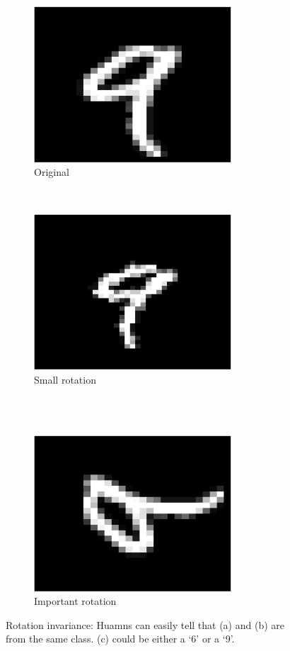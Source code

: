 \documentclass[a4paper,11pt]{report}
\begin{document}
\begin{itemize}
				\begin{figure}[h]
					\centering
					\begin{subfigure}[t]{0.48\textwidth}
						\centering
						\includegraphics[height=2.3in]{im_nine_ori.eps}
						\caption{\centering Original}
					\end{subfigure}%
					~
					\begin{subfigure}[t]{0.48\textwidth}
						\centering
						\includegraphics[height=2.3in]{im_nine_rot15.eps}
						\caption{\centering Small rotation}
					\end{subfigure}%
					\\ 
					~
					\begin{subfigure}[t]{0.48\textwidth}
						\centering
						\includegraphics[height=2.3in]{im_nine_rot90.eps}
						\caption{\centering Important rotation}
					\end{subfigure}
					
					\caption[Rotation invariance.]{\centering Rotation invariance: Huamns can easily tell that (a) and (b) are from the same class. (c) could be either a  `6' or a `9'.}
					\label{fig:Illustration rotation invariance}
				\end{figure}
			
			\end{itemize}
			
\end{document}
